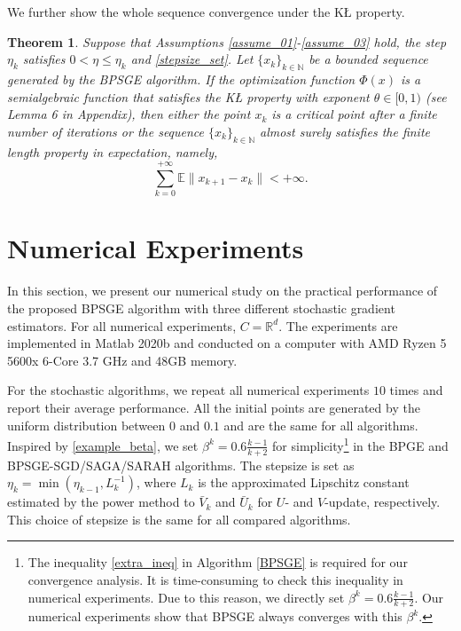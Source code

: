 \documentclass[letterpaper]{article} %
\newtheorem{theorem}{Theorem}
\begin{document}
	We further show the whole sequence convergence under the K{\L} property.
	\begin{theorem}\label{global_convergence}
		Suppose that Assumptions \ref{assume_01}-\ref{assume_03} hold, the step $\eta_{k}$ satisfies $0<\eta\le \eta_{k}$ and \eqref{stepsize_set}. Let $\{x_{k}\}_{k\in\mathbb{N}}$ be a bounded sequence generated by the BPSGE algorithm. If the optimization function $\Phi(x)$ is a semialgebraic function that satisﬁes the K{\L} property with exponent $\theta \in [0, 1)$ (see Lemma 6 in Appendix), then either the point $x_{k}$ is a critical point after a ﬁnite number of iterations or the sequence $\{ x_{k}\}_{k \in\mathbb{N}}$ almost surely satisﬁes the ﬁnite length property in expectation, namely,
		\[
		\sum_{k=0}^{+\infty}\mathbb{E}\|x_{k+1}-x_{k}\|<+\infty.
		\]
	\end{theorem}



	\section{Numerical Experiments}\label{numercial_experiments}
	In this section, we present our numerical study on the practical performance of the proposed BPSGE algorithm with three diﬀerent stochastic gradient estimators.  For all numerical experiments,  $C=\mathbb{R}^{d}$.  The experiments are implemented in Matlab 2020b and conducted on a computer with AMD Ryzen 5 5600x 6-Core 3.7 GHz and 48GB memory.

	For the stochastic algorithms, we repeat all numerical experiments $10$ times and report their average performance. All  the initial points are generated by the uniform distribution between $0$ and $0.1$ and are the same for all algorithms. Inspired by \eqref{example_beta}, we set $\beta^{k}=0.6\frac{k-1}{k+2}$  for simplicity\footnote{The inequality \eqref{extra_ineq} in Algorithm \ref{BPSGE} is required for our convergence analysis. It is time-consuming to check this inequality in numerical experiments. Due to this reason, we directly set $\beta^{k}=0.6\frac{k-1}{k+2}$. Our numerical experiments show that BPSGE always converges with this $\beta^k$.} in the BPGE and BPSGE-SGD/SAGA/SARAH algorithms. The stepsize is set as $\eta_{k}=\min(\eta_{k-1}, L_{k}^{-1})$, where $L_{k}$ is the approximated Lipschitz constant
	estimated by the power method to $\bar{V}_{k}$ and $\bar{U}_{k}$ for $U$- and $V$-update,  respectively.
	This choice of stepsize is  the  same  for all  compared algorithms.
\end{document}
